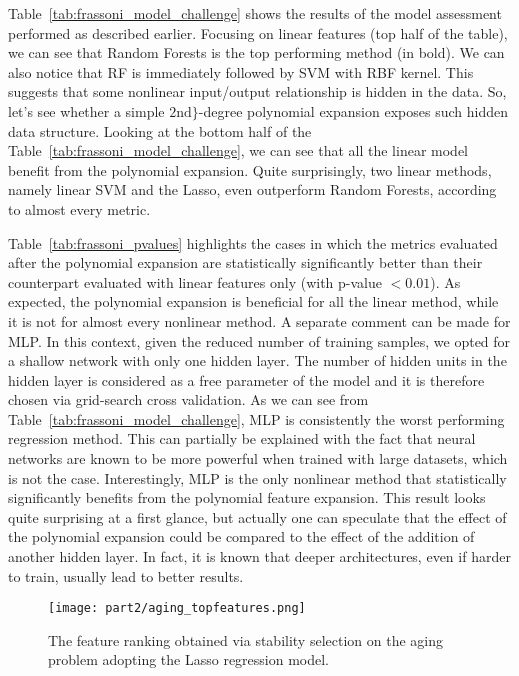 


Table~\ref{tab:frassoni_model_challenge} shows the results of the model assessment performed as described earlier. Focusing on linear features (top half of the table), we can see that Random Forests is the top performing method (in bold). We can also notice that RF is immediately followed by SVM with RBF kernel. This suggests that some nonlinear input/output relationship is hidden in the data. So, let's see whether a simple $2\text{nd}\}$-degree polynomial expansion exposes such hidden data structure.
Looking at the bottom half of the Table~\ref{tab:frassoni_model_challenge}, we can see that all the linear model benefit from the polynomial expansion. Quite surprisingly, two linear methods, namely linear SVM and the Lasso, even outperform Random Forests, according to almost every metric.

Table~\ref{tab:frassoni_pvalues} highlights the cases in which the metrics evaluated after the polynomial expansion are statistically significantly better than their counterpart evaluated with linear features only (with p-value $< 0.01$).
As expected, the polynomial expansion is beneficial for all the linear method, while it is not for almost every nonlinear method.
A separate comment can be made for MLP. In this context, given the reduced number of training samples, we opted for a shallow network with only one hidden layer. The number of hidden units in the hidden layer is considered as a free parameter of the model and it is therefore chosen via grid-search cross validation.
As we can see from Table~\ref{tab:frassoni_model_challenge}, MLP is consistently the worst performing regression method. This can partially be explained with the fact that neural networks are known to be more powerful when trained with large datasets, which is not the case. Interestingly, MLP is the only nonlinear method that statistically significantly benefits from the polynomial feature expansion.
This result looks quite surprising at a first glance, but actually one can speculate that the effect of the polynomial expansion could be compared to the effect of the addition of another hidden layer. In fact, it is known that deeper architectures, even if harder to train, usually lead to better results.

\begin{figure}[h!]
	\centering
	\texttt{[image: part2/aging\_topfeatures.png]}
	\caption{The feature ranking obtained via stability selection on the aging problem adopting the Lasso regression model.} \label{fig:frassoni_topfeat}
\end{figure}

